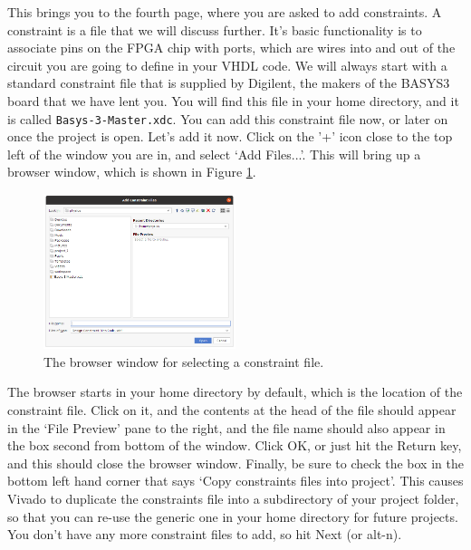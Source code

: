 \documentclass[../physical_computing.tex]{subfiles}
\begin{document}
This brings you to the fourth page, where you are asked to add constraints. A constraint is a file that we will discuss further. It's basic functionality is to associate pins on the FPGA chip with ports, which are wires into and out of the circuit you are going to define in your VHDL code. We will always start with a standard constraint file that is supplied by Digilent, the makers of the BASYS3 board that we have lent you. You will find this file in your home directory, and it is called \texttt{Basys-3-Master.xdc}. You can add this constraint file now, or later on once the project is open. Let's add it now. Click on the '+' icon close to the top left of the window you are in, and select `Add Files...'. This will bring up a browser window, which is shown in Figure \ref{fig:add_constraint_file}.

\begin{figure}[htbp]
    \centering
    \includegraphics[width=0.5\textwidth]{figures/add_constraint_file.png}
    \caption{The browser window for selecting a constraint file.}
    \label{fig:add_constraint_file}
\end{figure}

The browser starts in your home directory by default, which is the location of the constraint file. Click on it, and the contents at the head of the file should appear in the `File Preview' pane to the right, and the file name should also appear in the box second from bottom of the window. Click OK, or just hit the Return key, and this should close the browser window. Finally, be sure to check the box in the bottom left hand corner that says `Copy constraints files into project'. This causes Vivado to duplicate the constraints file into a subdirectory of your project folder, so that you can re-use the generic one in your home directory for future projects. You don't have any more constraint files to add, so hit Next (or alt-n).
\end{document}
